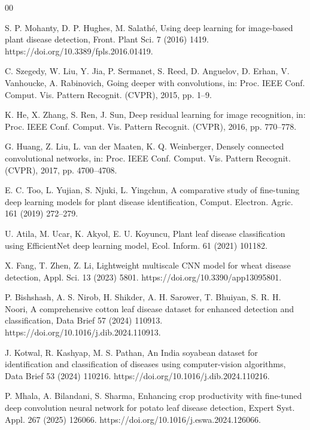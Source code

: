 \documentclass[a4paper,fleqn]{cas-dc}
\begin{document}
\begin{thebibliography}{00}

S. P. Mohanty, D. P. Hughes, M. Salath\'e,
Using deep learning for image-based plant disease detection,
Front. Plant Sci. 7 (2016) 1419.
https://doi.org/10.3389/fpls.2016.01419.

C. Szegedy, W. Liu, Y. Jia, P. Sermanet, S. Reed, D. Anguelov, D. Erhan, V. Vanhoucke, A. Rabinovich,
Going deeper with convolutions,
in: Proc. IEEE Conf. Comput. Vis. Pattern Recognit. (CVPR), 2015, pp. 1--9.

K. He, X. Zhang, S. Ren, J. Sun,
Deep residual learning for image recognition,
in: Proc. IEEE Conf. Comput. Vis. Pattern Recognit. (CVPR), 2016, pp. 770--778.

G. Huang, Z. Liu, L. van der Maaten, K. Q. Weinberger,
Densely connected convolutional networks,
in: Proc. IEEE Conf. Comput. Vis. Pattern Recognit. (CVPR), 2017, pp. 4700--4708.

E. C. Too, L. Yujian, S. Njuki, L. Yingchun,
A comparative study of fine-tuning deep learning models for plant disease identification,
Comput. Electron. Agric. 161 (2019) 272--279.

U. Atila, M. Ucar, K. Akyol, E. U. Koyuncu,
Plant leaf disease classification using EfficientNet deep learning model,
Ecol. Inform. 61 (2021) 101182.

X. Fang, T. Zhen, Z. Li,
Lightweight multiscale CNN model for wheat disease detection,
Appl. Sci. 13 (2023) 5801.
https://doi.org/10.3390/app13095801.

P. Bishshash, A. S. Nirob, H. Shikder, A. H. Sarower, T. Bhuiyan, S. R. H. Noori,
A comprehensive cotton leaf disease dataset for enhanced detection and classification,
Data Brief 57 (2024) 110913.
https://doi.org/10.1016/j.dib.2024.110913.

J. Kotwal, R. Kashyap, M. S. Pathan,
An India soyabean dataset for identification and classification of diseases using computer-vision algorithms,
Data Brief 53 (2024) 110216.
https://doi.org/10.1016/j.dib.2024.110216.

P. Mhala, A. Bilandani, S. Sharma,
Enhancing crop productivity with fine-tuned deep convolution neural network for potato leaf disease detection,
Expert Syst. Appl. 267 (2025) 126066.
https://doi.org/10.1016/j.eswa.2024.126066.

\end{thebibliography}
\end{document}
